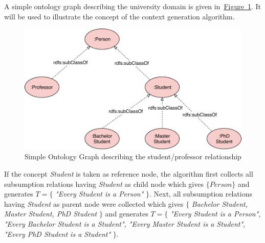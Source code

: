A simple ontology graph describing the university domain is given in~\hyperref[fig:simple_owl_graph]{Figure~\ref*{fig:simple_owl_graph}}. It will
be used to illustrate the concept of the context generation algorithm.
\begin{figure}
	 \centering
	 \includegraphics[width=\textwidth]{drawio/University_Ontology_Example-Professor-Student}
	 \caption{Simple Ontology Graph describing the student/professor relationship}\label{fig:simple_owl_graph}
\end{figure}
If the concept \emph{Student} is taken as reference node, the algorithm first collects all subsumption relations having \emph{Student} as child node which gives $\{Person\}$ and generates $T=\{$ \emph{"Every Student is a Person"} $\}$. Next, all subsumption relations having \emph{Student} as parent node were collected which gives $\{$ \emph{Bachelor Student, Master Student, PhD Student} $\}$ and generates $T=\{$ \emph{"Every Student is a Person", "Every Bachelor Student is a Student", "Every Master Student is a Student", "Every PhD Student is a Student"} $\}$. 

